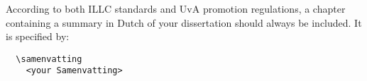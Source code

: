 
\samenvatting
According to both ILLC standards and UvA promotion regulations,
a chapter containing a summary in
Dutch of your dissertation should always be included.
It is specified by:
\begin{verbatim}
  \samenvatting
    <your Samenvatting>
\end{verbatim}
